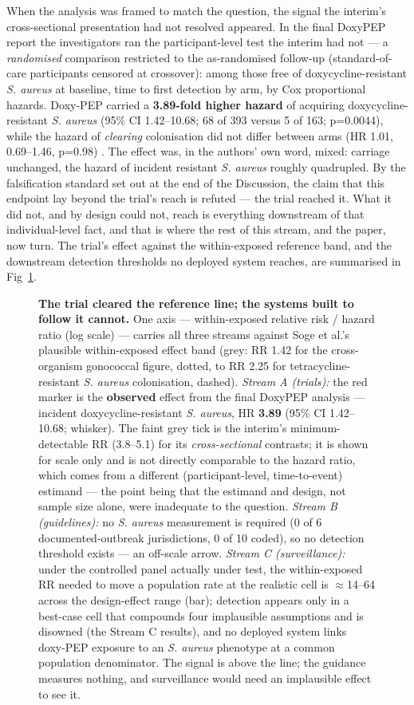 \documentclass[10pt,letterpaper]{article}
\begin{document}
When the analysis was framed to match the question, the signal the
interim's cross-sectional presentation had not resolved appeared. In the
final DoxyPEP report the investigators ran the participant-level test
the interim had not --- a \emph{randomised} comparison restricted to the
as-randomised follow-up (standard-of-care participants censored at
crossover): among those free of doxycycline-resistant \emph{S. aureus}
at baseline, time to first detection by arm, by Cox proportional
hazards. Doxy-PEP carried a \textbf{3.89-fold higher hazard} of
acquiring doxycycline-resistant \emph{S. aureus} (95\% CI 1.42--10.68;
68 of 393 versus 5 of 163; p=0.0044), while the hazard of
\emph{clearing} colonisation did not differ between arms (HR 1.01,
0.69--1.46, p=0.98) \cite{luetkemeyer2025}. The effect was, in the
authors' own word, mixed: carriage unchanged, the hazard of incident resistant \emph{S. aureus} roughly quadrupled. By the falsification standard set out at the end of the
Discussion, the claim that this endpoint lay beyond the trial's reach is
refuted --- the trial reached it. What it did not, and by design could
not, reach is everything downstream of that individual-level fact, and
that is where the rest of this stream, and the paper, now turn. The trial's effect against the within-exposed reference band, and the downstream detection thresholds no deployed system reaches, are summarised in Fig~\ref{fig2}.

\begin{figure}[!h]
\caption{{\bf The trial cleared the reference line; the systems built to follow it cannot.}
One axis --- within-exposed relative risk / hazard ratio (log scale) --- carries all three streams
against Soge et al.'s plausible within-exposed effect band (grey: RR 1.42 for the cross-organism
gonococcal figure, dotted, to RR 2.25 for tetracycline-resistant \emph{S. aureus} colonisation,
dashed). \emph{Stream A (trials):} the red marker is the \textbf{observed} effect from the final
DoxyPEP analysis --- incident doxycycline-resistant \emph{S. aureus}, HR \textbf{3.89} (95\% CI
1.42--10.68; whisker). The faint grey tick is the interim's minimum-detectable RR (3.8--5.1) for its
\emph{cross-sectional} contrasts; it is shown for scale only and is not directly comparable to the
hazard ratio, which comes from a different (participant-level, time-to-event) estimand --- the point
being that the estimand and design, not sample size alone, were inadequate to the question. \emph{Stream B
(guidelines):} no \emph{S. aureus} measurement is required (0 of 6 documented-outbreak jurisdictions,
0 of 10 coded), so no detection threshold exists --- an off-scale arrow. \emph{Stream C
(surveillance):} under the controlled panel actually under test, the within-exposed RR needed to move
a population rate at the realistic cell is $\approx$14--64 across the design-effect range (bar);
detection appears only in a best-case cell that compounds four implausible assumptions and is disowned
(the Stream C results), and no deployed system links doxy-PEP exposure to an \emph{S. aureus} phenotype
at a common population denominator. The signal is above the line; the guidance measures nothing, and
surveillance would need an implausible effect to see it.}
\label{fig2}
\end{figure}
\end{document}
